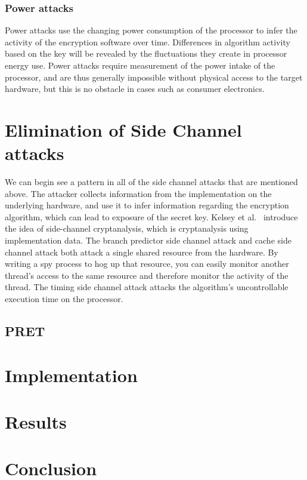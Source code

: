\documentclass[times, 10pt,twocolumn]{article}
\begin{document}
\subsubsection{Power attacks}
Power attacks use the changing power consumption of the processor to infer the activity of the encryption software over time.  Differences in algorithm activity based on the key will be revealed by the fluctuations they create in processor energy use.  Power attacks require measurement of the power intake of the processor, and are thus generally impossible without physical access to the target hardware, but this is no obstacle in cases such as consumer electronics.

\section{Elimination of Side Channel attacks}
We can begin see a pattern in all of the side channel attacks that are mentioned above. The attacker collects information from the implementation on the underlying hardware, and use it to infer information regarding the encryption algorithm, which can lead to exposure of the secret key. Kelsey et al.~\cite{Kelsey98sidechannel} introduce the idea of side-channel cryptanalysis, which is cryptanalysis using implementation data. The branch predictor side channel attack and cache side channel attack both attack a single shared resource from the hardware. By writing a spy process to hog up that resource, you can easily monitor another thread's access to the same resource and therefore monitor the activity of the thread. The timing side channel attack attacks the algorithm's uncontrollable execution time on the processor. 



\subsection{PRET}


\section{Implementation}

\section{Results}



\section{Conclusion}




\end{document}
